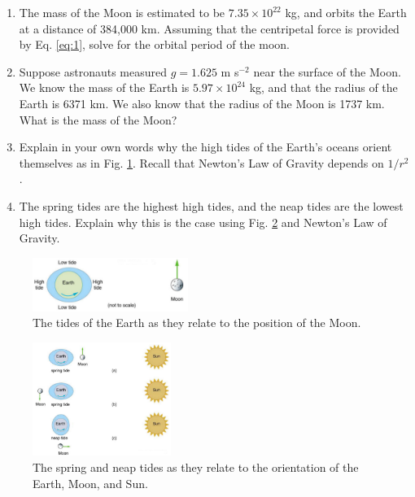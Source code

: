 \documentclass{article}
\begin{document}
\begin{enumerate}
\item The mass of the Moon is estimated to be $7.35 \times 10^{22}$ kg, and orbits the Earth at a distance of 384,000 km.  Assuming that the centripetal force is provided by Eq. \ref{eq:1}, solve for the orbital period of the moon. \\ \vspace{3.5cm}
\item Suppose astronauts measured $g=1.625$ m s$^{-2}$ near the surface of the Moon.  We know the mass of the Earth is $5.97 \times 10^{24}$ kg, and that the radius of the Earth is 6371 km.  We also know that the radius of the Moon is 1737 km.  What is the mass of the Moon? \\ \vspace{3.5cm}
\item
Explain in your own words why the high tides of the Earth's oceans orient themselves as in Fig. \ref{fig:tide1}.  Recall that Newton's Law of Gravity depends on $1/r^2$.  \\ \vspace{2cm}
\item The spring tides are the highest high tides, and the neap tides are the lowest high tides.  Explain why this is the case using Fig. \ref{fig:tide2} and Newton's Law of Gravity.
\end{enumerate}

\begin{figure}
\centering
\includegraphics[width=0.45\textwidth]{tide1.png}
\caption{\label{fig:tide1} The tides of the Earth as they relate to the position of the Moon.}
\end{figure}

\begin{figure}
\centering
\includegraphics[width=0.4\textwidth]{tide2.png}
\caption{\label{fig:tide2} The spring and neap tides as they relate to the orientation of the Earth, Moon, and Sun.}
\end{figure}
\end{document}
